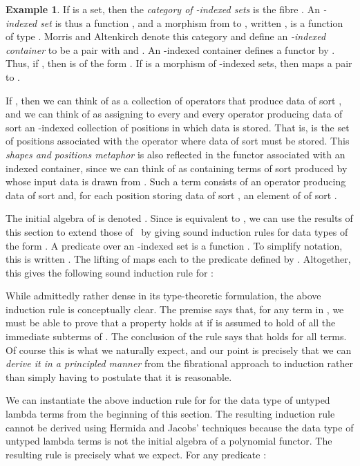 \documentclass{LMCS}
\theoremstyle{plain}
\theoremstyle{remark}
\theoremstyle{definition}
\newtheorem{example}[theorem]{Example}
\begin{document}
\begin{example}\label{ex:indind}
  If  is a set, then the {\em category of -indexed sets} is the
  fibre . An {\em -indexed set} is thus a function
  , and a morphism  from  to , written , is a function of type . Morris and Altenkirch denote this category  and
  define an {\em -indexed container} to be a pair  with  and . An
  -indexed container defines a functor  by .  Thus, if , then  is of the form
  . If  is a morphism of -indexed sets, then
   maps a pair  to .

  If , then we can think of  as a collection of
  operators that produce data of sort , and we can think of  as
  assigning to every  and every operator producing data of sort 
  an -indexed collection of positions in which data is stored. That
  is,  is the set of positions associated with the
  operator  where data of sort  must be stored. This {\em shapes
    and positions metaphor} is also reflected in the functor
  associated with an indexed container, since we can think of  as containing terms of sort  produced by  whose input
  data is drawn from . Such a term consists of an operator 
  producing data of sort  and, for each position storing data of
  sort , an element of  of sort .

  The initial algebra of  is denoted .  Since  is equivalent to , we
  can use the results of this section to extend those of~\cite{ma09}
  by giving sound induction rules for data types of the form
  . A predicate over an -indexed set  is a function .  To simplify notation, this is written
  . The lifting  of  maps each
   to the predicate  defined by .  Altogether, this gives the following sound induction rule for
  :


\vspace*{0.15in}

While admittedly rather dense in its type-theoretic formulation, the
above induction rule is conceptually clear. The premise says that, for
any term  in , we must be able to
prove that a property  holds at
 if  is assumed to hold of all the immediate
subterms of . The conclusion of the rule says
that  holds for all terms. Of course this is what we naturally
expect, and our point is precisely that we can {\em derive it in a
  principled manner} from the fibrational approach to induction rather
than simply having to postulate that it is reasonable.

We can instantiate the above induction rule for  for the data
type of untyped lambda terms from the beginning of this section. The
resulting induction rule cannot be derived using Hermida and Jacobs'
techniques because the data type of untyped lambda terms is not the
initial algebra of a polynomial functor. The resulting rule is
precisely what we expect. For any predicate :


\end{example}
\end{document}
